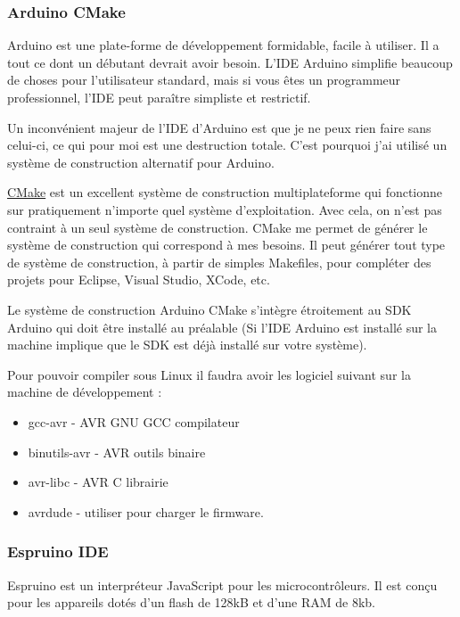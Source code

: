 \subsubsection{Arduino CMake}

Arduino est une plate-forme de développement formidable, facile à utiliser. Il a tout ce dont un débutant devrait avoir besoin. L'IDE Arduino simplifie beaucoup de choses pour l'utilisateur standard, mais si vous êtes un programmeur professionnel, l'IDE peut paraître simpliste et restrictif.

Un inconvénient majeur de l'IDE d'Arduino est que je ne peux rien faire sans celui-ci, ce qui pour moi est une destruction totale. C'est pourquoi j'ai utilisé un système de construction alternatif pour Arduino.

\href{https://github.com/queezythegreat/arduino-cmake}{CMake} est un excellent système de construction multiplateforme qui fonctionne sur pratiquement n'importe quel système d'exploitation. Avec cela, on n'est pas contraint à un seul système de construction. CMake me permet de générer le système de construction qui correspond à mes besoins. Il peut générer tout type de système de construction, à partir de simples Makefiles, pour compléter des projets pour Eclipse, Visual Studio, XCode, etc.

Le système de construction Arduino CMake s'intègre étroitement au SDK Arduino qui doit être installé au préalable (Si l'IDE Arduino est installé sur la machine implique que le SDK est déjà installé sur votre système).

Pour pouvoir compiler sous Linux il faudra avoir les logiciel suivant sur la machine de développement  :

\begin{itemize}
\item gcc-avr - AVR GNU GCC compilateur 
\item binutils-avr - AVR outils binaire
\item avr-libc - AVR C librairie
\item avrdude - utiliser pour charger le firmware.
\end{itemize}


\subsubsection{Espruino IDE}

Espruino est un interpréteur JavaScript pour les microcontrôleurs. Il est conçu pour les appareils dotés d'un flash de 128kB et d'une RAM de 8kb.

